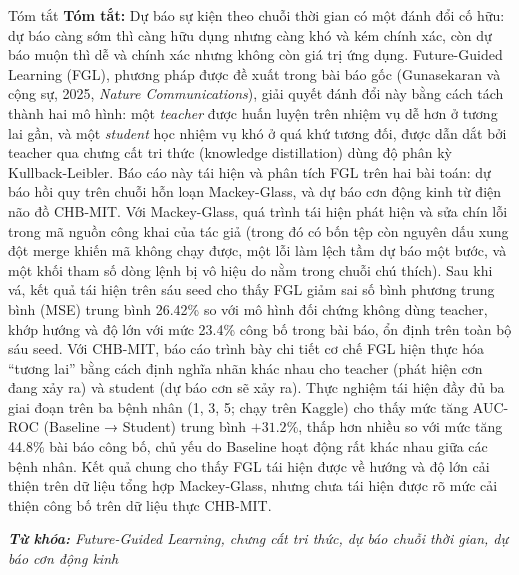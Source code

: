 \begin{preamble}{Tóm tắt}
\textbf{Tóm tắt:} Dự báo sự kiện theo chuỗi thời gian có một đánh đổi cố hữu: dự báo càng
sớm thì càng hữu dụng nhưng càng khó và kém chính xác, còn dự báo muộn thì dễ và chính xác
nhưng không còn giá trị ứng dụng. Future-Guided Learning (FGL), phương pháp được đề xuất
trong bài báo gốc (Gunasekaran và cộng sự, 2025, \textit{Nature Communications}), giải
quyết đánh đổi này bằng cách tách thành hai mô hình: một \textit{teacher} được huấn luyện
trên nhiệm vụ dễ hơn ở tương lai gần, và một \textit{student} học nhiệm vụ khó ở quá khứ
tương đối, được dẫn dắt bởi teacher qua chưng cất tri thức (knowledge distillation) dùng độ
phân kỳ Kullback-Leibler. Báo cáo này tái hiện và phân tích FGL trên hai bài toán: dự báo
hồi quy trên chuỗi hỗn loạn Mackey-Glass, và dự báo cơn động kinh từ điện não đồ CHB-MIT.
Với Mackey-Glass, quá trình tái hiện phát hiện và sửa chín lỗi trong mã nguồn công khai của
tác giả (trong đó có bốn tệp còn nguyên dấu xung đột merge khiến mã không chạy được, một lỗi
làm lệch tầm dự báo một bước, và một khối tham số dòng lệnh bị vô hiệu do nằm trong chuỗi
chú thích). Sau khi vá, kết quả tái hiện trên sáu seed cho thấy FGL giảm sai số bình phương
trung bình (MSE) trung bình 26.42\% so với mô hình đối chứng không dùng teacher, khớp hướng
và độ lớn với mức 23.4\% công bố trong bài báo, ổn định trên toàn bộ sáu seed. Với CHB-MIT,
báo cáo trình bày chi tiết cơ chế FGL hiện thực hóa ``tương lai'' bằng cách định nghĩa nhãn
khác nhau cho teacher (phát hiện cơn đang xảy ra) và student (dự báo cơn sẽ xảy ra). Thực
nghiệm tái hiện đầy đủ ba giai đoạn trên ba bệnh nhân (1, 3, 5; chạy trên Kaggle) cho thấy
mức tăng AUC-ROC (Baseline → Student) trung bình $+31.2\%$, thấp hơn nhiều
so với mức tăng 44.8\% bài báo công bố, chủ yếu do Baseline hoạt động rất khác nhau giữa các
bệnh nhân. Kết quả chung cho thấy FGL tái hiện được về hướng và độ lớn cải thiện trên dữ liệu
tổng hợp Mackey-Glass, nhưng chưa tái hiện được rõ mức cải thiện công bố trên dữ liệu thực
CHB-MIT.

\textit{\textbf{Từ khóa:} Future-Guided Learning, chưng cất tri thức, dự báo chuỗi thời gian, dự báo cơn động kinh}
\end{preamble}

%
